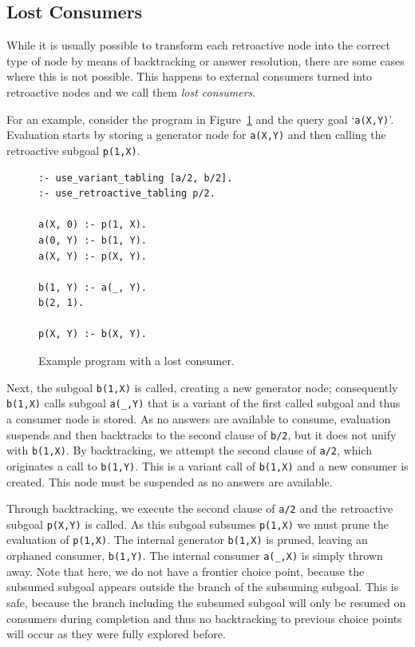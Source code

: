\subsection{Lost Consumers}

While it is usually possible to transform each retroactive node into the correct type of node by means
of backtracking or answer resolution, there are some cases where this is not possible. This happens to
external consumers turned into retroactive nodes and we call them \textit{lost consumers}.

For an example, consider the program in Figure~\ref{fig:retro_lost_consumer_code} and the query goal
`\texttt{a(X,Y)}'. Evaluation starts by storing a generator node for \texttt{a(X,Y)} and then calling
the retroactive subgoal \texttt{p(1,X)}.

\begin{figure}[ht]
\begin{Verbatim}
:- use_variant_tabling [a/2, b/2].
:- use_retroactive_tabling p/2.

a(X, 0) :- p(1, X).
a(0, Y) :- b(1, Y).
a(X, Y) :- p(X, Y).

b(1, Y) :- a(_, Y).
b(2, 1).

p(X, Y) :- b(X, Y).
\end{Verbatim}
\caption{Example program with a lost consumer.}
\label{fig:retro_lost_consumer_code}
\end{figure}

Next, the subgoal \texttt{b(1,X)} is called, creating a new
generator node; consequently \texttt{b(1,X)} calls subgoal \texttt{a(\_,Y)} that is a variant of the
first called subgoal and thus a consumer node is stored. As no answers are available to consume,
evaluation suspends and then backtracks to the second clause of \texttt{b/2}, but it does not
unify with \texttt{b(1,X)}. By backtracking, we attempt the second clause of \texttt{a/2}, which
originates a call to \texttt{b(1,Y)}. This is a variant call of \texttt{b(1,X)} and a new consumer is
created. This node must be suspended as no answers are available.

Through backtracking, we execute the second clause of \texttt{a/2} and the retroactive subgoal \texttt{p(X,Y)}
is called. As this subgoal subsumes \texttt{p(1,X)} we must prune the evaluation of \texttt{p(1,X)}.
The internal generator \texttt{b(1,X)} is pruned, leaving an orphaned consumer, \texttt{b(1,Y)}. The internal
consumer \texttt{a(\_,X)} is simply thrown away. Note that here, we do not have a frontier choice point,
because the subsumed subgoal appears outside the branch of the subsuming subgoal. This is safe, because
the branch including the subsumed subgoal will only be resumed on consumers during completion and thus
no backtracking to previous choice points will occur as they were fully explored before.

